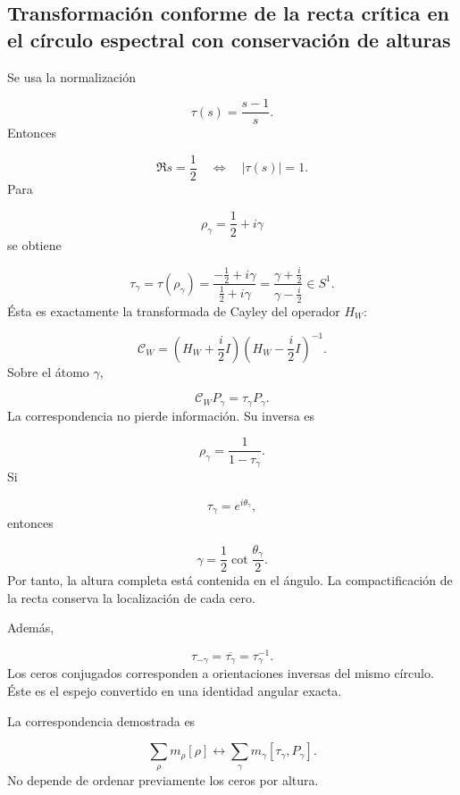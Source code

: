 \subsection{Transformación conforme de la recta crítica en el círculo espectral con conservación de alturas}
Se usa la normalización\par
\[
\tau(s)=\frac{s-1}{s}.
\]
Entonces\par
\[
\Re s=\frac12
\quad\Longleftrightarrow\quad
|\tau(s)|=1.
\]
Para\par
\[
\rho_\gamma=\frac12+i\gamma
\]
se obtiene\par
\[
\tau_\gamma
=
\tau(\rho_\gamma)
=
\frac{-\frac12+i\gamma}{\frac12+i\gamma}
=
\frac{\gamma+\frac i2}{\gamma-\frac i2}
\in S^1.
\]
Ésta es exactamente la transformada de Cayley del operador \(H_W\):\par
\[
\mathcal C_W
=
\left(H_W+\frac i2I\right)
\left(H_W-\frac i2I\right)^{-1}.
\]
Sobre el átomo \(\gamma\),\par
\[
\mathcal C_WP_\gamma
=
\tau_\gamma P_\gamma.
\]
La correspondencia no pierde información. Su inversa es\par
\[
\rho_\gamma=\frac1{1-\tau_\gamma}.
\]
Si\par
\[
\tau_\gamma=e^{i\theta_\gamma},
\]
entonces\par
\[
\boxed{
\gamma
=
\frac12\cot\frac{\theta_\gamma}{2}.
}
\]
Por tanto, la altura completa está contenida en el ángulo. La compactificación de la recta conserva la localización de cada cero.\par
Además,\par
\[
\tau_{-\gamma}
=
\overline{\tau_\gamma}
=
\tau_\gamma^{-1}.
\]
Los ceros conjugados corresponden a orientaciones inversas del mismo círculo. Éste es el espejo convertido en una identidad angular exacta.\par
La correspondencia demostrada es\par
\[
\boxed{
\sum_\rho m_\rho[\rho]
\longleftrightarrow
\sum_\gamma m_\gamma
[\tau_\gamma,P_\gamma].
}
\]
No depende de ordenar previamente los ceros por altura.\par
{}
